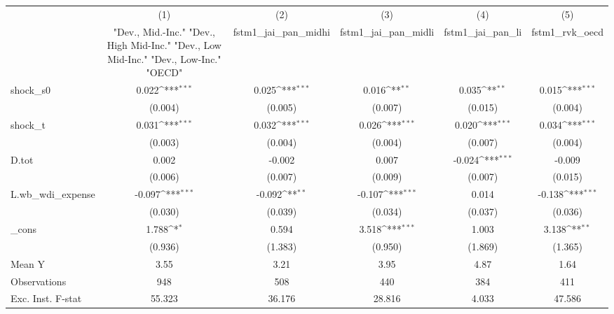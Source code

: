 {
\def\sym#1{\ifmmode^{#1}\else\(^{#1}\)\fi}
\begin{tabular}{l*{5}{c}}
\toprule
            &\multicolumn{1}{c}{(1)}&\multicolumn{1}{c}{(2)}&\multicolumn{1}{c}{(3)}&\multicolumn{1}{c}{(4)}&\multicolumn{1}{c}{(5)}\\
            &\multicolumn{1}{c}{ "Dev., Mid.-Inc." "Dev., High Mid-Inc." "Dev., Low Mid-Inc." "Dev., Low-Inc." "OECD" }&\multicolumn{1}{c}{fstm1\_jai\_pan\_midhi}&\multicolumn{1}{c}{fstm1\_jai\_pan\_midli}&\multicolumn{1}{c}{fstm1\_jai\_pan\_li}&\multicolumn{1}{c}{fstm1\_rvk\_oecd}\\
\midrule
shock\_s0    &       0.022\sym{***}&       0.025\sym{***}&       0.016\sym{**} &       0.035\sym{**} &       0.015\sym{***}\\
            &     (0.004)         &     (0.005)         &     (0.007)         &     (0.015)         &     (0.004)         \\
\addlinespace
shock\_t     &       0.031\sym{***}&       0.032\sym{***}&       0.026\sym{***}&       0.020\sym{***}&       0.034\sym{***}\\
            &     (0.003)         &     (0.004)         &     (0.004)         &     (0.007)         &     (0.004)         \\
\addlinespace
D.tot       &       0.002         &      -0.002         &       0.007         &      -0.024\sym{***}&      -0.009         \\
            &     (0.006)         &     (0.007)         &     (0.009)         &     (0.007)         &     (0.015)         \\
\addlinespace
L.wb\_wdi\_expense&      -0.097\sym{***}&      -0.092\sym{**} &      -0.107\sym{***}&       0.014         &      -0.138\sym{***}\\
            &     (0.030)         &     (0.039)         &     (0.034)         &     (0.037)         &     (0.036)         \\
\addlinespace
\_cons      &       1.788\sym{*}  &       0.594         &       3.518\sym{***}&       1.003         &       3.138\sym{**} \\
            &     (0.936)         &     (1.383)         &     (0.950)         &     (1.869)         &     (1.365)         \\
\midrule
Mean Y      &        3.55         &        3.21         &        3.95         &        4.87         &        1.64         \\
Observations&         948         &         508         &         440         &         384         &         411         \\
Exc. Inst. F-stat&      55.323         &      36.176         &      28.816         &       4.033         &      47.586         \\
\bottomrule
\end{tabular}
}
